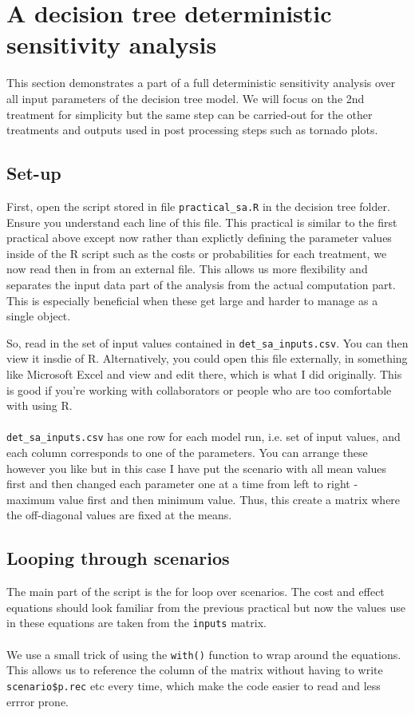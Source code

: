 %
\chapter{A decision tree deterministic sensitivity analysis}
This section demonstrates a part of a full deterministic sensitivity analysis over all input parameters of the decision tree model.
We will focus on the 2nd treatment for simplicity but the same step can be carried-out for the other treatments and outputs used in post processing steps such as tornado plots.


\section{Set-up}
First, open the script stored in file \texttt{practical\_sa.R} in the decision tree folder. Ensure you understand each line of this file.
This practical is similar to the first practical above except now rather than explictly defining the parameter values inside of the R script such as the costs or probabilities for each treatment, we now read then in from an external file. This allows us more flexibility and separates the input data part of the analysis from the actual computation part.
This is especially beneficial when these get large and harder to manage as a single object.

So, read in the set of input values contained in \texttt{det\_sa\_inputs.csv}. You can then view it insdie of R. Alternatively, you could open this file externally, in something like Microsoft Excel and view and edit there, which is what I did originally. This is good if you're working with collaborators or people who are too comfortable with using R.
\\
\\
\texttt{det\_sa\_inputs.csv} has one row for each  model run, i.e. set of input values, and each column corresponds to one of the parameters.
You can arrange these however you like but in this case I have put the scenario with all mean values first and then changed each parameter one at a time from left to right - maximum value first and then minimum value. Thus, this create a matrix where the off-diagonal values are fixed at the means.


\section{Looping through scenarios}
The main part of the script is the for loop over scenarios. The cost and effect equations should look familiar from the previous practical but now the values use in these equations are taken from the \texttt{inputs} matrix.
\\
\\
We use a small trick of using the \texttt{with()} function to wrap around the equations. This allows us to reference the column of the matrix without having to write \texttt{scenario\$p.rec} etc every time, which make the code easier to read and less errror prone.

